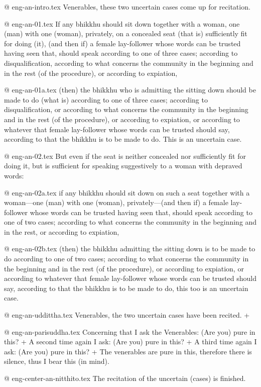 @ eng-an-intro.tex
Venerables, these two uncertain cases come up for recitation.

@ eng-an-01.tex
If any bhikkhu should sit down together with a woman, one (man) with one (woman), privately, on a concealed seat (that is) sufficiently fit for doing (it), (and then if) a female lay-follower whose words can be trusted having seen that, should speak according to one of three cases; according to disqualification, according to what concerns the community in the beginning and in the rest (of the procedure), or according to expiation,

@ eng-an-01a.tex
(then) the bhikkhu who is admitting the sitting down should be made to do (what is) according to one of three cases; according to disqualification, or according to what concerns the community in the beginning and in the rest (of the procedure), or according to expiation, or according to whatever that female lay-follower whose words can be trusted should say, according to that the bhikkhu is to be made to do. This is an uncertain case.

@ eng-an-02.tex
But even if the seat is neither concealed nor sufficiently fit for doing it, but is sufficient for speaking suggestively to a woman with depraved words:

@ eng-an-02a.tex
if any bhikkhu should sit down on such a seat together with a woman—one (man) with one (woman), privately—(and then if) a female lay-follower whose words can be trusted having seen that, should speak according to one of two cases; according to what concerns the community in the beginning and in the rest, or according to expiation,

@ eng-an-02b.tex
(then) the bhikkhu admitting the sitting down is to be made to do according to one of two cases; according to what concerns the community in the beginning and in the rest (of the procedure), or according to expiation, or according to whatever that female lay-follower whose words can be trusted should say, according to that the bhikkhu is to be made to do, this too is an uncertain case.

@ eng-an-uddittha.tex
Venerables, the two uncertain cases have been recited. +

@ eng-an-parisuddha.tex
Concerning that I ask the Venerables: (Are you) pure in this? +
A second time again I ask: (Are you) pure in this? +
A third time again I ask: (Are you) pure in this? +
The venerables are pure in this, therefore there is silence, thus I bear this (in mind).

@ eng-center-an-nitthito.tex
The recitation of the uncertain (cases) is finished.
